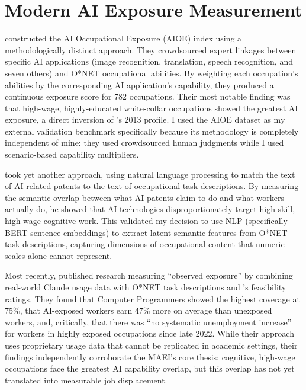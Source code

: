 \section{Modern AI Exposure Measurement}
\label{sec:modern-measurement}

\citet{Felten_Raj_Seamans_2021} constructed the AI Occupational Exposure (AIOE) index using a methodologically distinct approach. They crowdsourced expert linkages between specific AI applications (image recognition, translation, speech recognition, and seven others) and O*NET occupational abilities. By weighting each occupation's abilities by the corresponding AI application's capability, they produced a continuous exposure score for 782 occupations. Their most notable finding was that high-wage, highly-educated white-collar occupations showed the greatest AI exposure, a direct inversion of \citet{Frey_Osborne_2017}'s 2013 profile. I used the AIOE dataset as my external validation benchmark specifically because its methodology is completely independent of mine: they used crowdsourced human judgments while I used scenario-based capability multipliers.

\citet{Webb_2020} took yet another approach, using natural language processing to match the text of AI-related patents to the text of occupational task descriptions. By measuring the semantic overlap between what AI patents claim to do and what workers actually do, he showed that AI technologies disproportionately target high-skill, high-wage cognitive work. This validated my decision to use NLP (specifically BERT sentence embeddings) to extract latent semantic features from O*NET task descriptions, capturing dimensions of occupational content that numeric scales alone cannot represent.

Most recently, \citet{Anthropic_2026} published research measuring ``observed exposure'' by combining real-world Claude usage data with O*NET task descriptions and \citet{Eloundou_Manning_2023}'s feasibility ratings. They found that Computer Programmers showed the highest coverage at 75\%, that AI-exposed workers earn 47\% more on average than unexposed workers, and, critically, that there was ``no systematic unemployment increase'' for workers in highly exposed occupations since late 2022. While their approach uses proprietary usage data that cannot be replicated in academic settings, their findings independently corroborate the MAEI's core thesis: cognitive, high-wage occupations face the greatest AI capability overlap, but this overlap has not yet translated into measurable job displacement.

